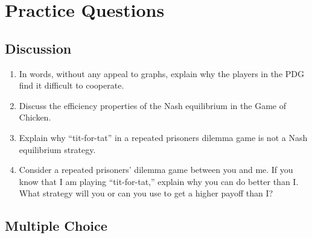 \documentclass[
]{book}
\providecommand{\tightlist}{%
  \setlength{\itemsep}{0pt}\setlength{\parskip}{0pt}}
\begin{document}
\hypertarget{practice-questions-7}{%
\section{Practice Questions}\label{practice-questions-7}}

\hypertarget{discussion-7}{%
\subsection{Discussion}\label{discussion-7}}

\begin{enumerate}
\def\labelenumi{\arabic{enumi}.}
\tightlist
\item
  In words, without any appeal to graphs, explain why the players in the PDG find it difficult to cooperate.
\item
  Discuss the efficiency properties of the Nash equilibrium in the Game of Chicken.\\
\item
  Explain why ``tit-for-tat'' in a repeated prisoners dilemma game is not a Nash equilibrium strategy.
\item
  Consider a repeated prisoners' dilemma game between you and me. If you know that I am playing ``tit-for-tat,'' explain why you can do better than I. What strategy will you or can you use to get a higher payoff than I?
\end{enumerate}

\hypertarget{multiple-choice-7}{%
\subsection{Multiple Choice}\label{multiple-choice-7}}
\end{document}
